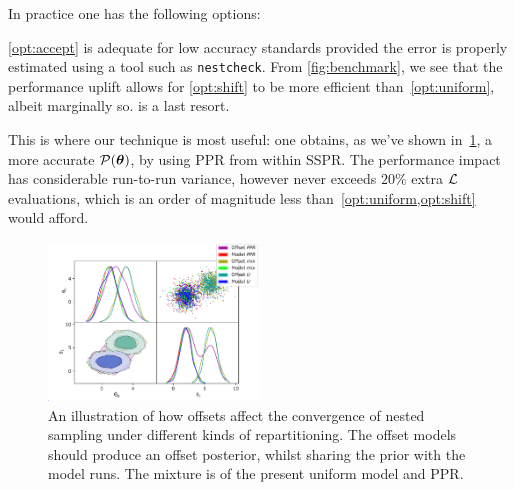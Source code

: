 \documentclass[usenatbib]{mnras}
\begin{document}
In practice one has the following options:
\vref{opt:accept} is adequate for low accuracy standards provided the
error is properly estimated using a tool such as \texttt{nestcheck}.
From \cref{fig:benchmark}, we see that the performance uplift allows
for \cref{opt:shift} to be more efficient than~\ref{opt:uniform},
albeit marginally so.  is a last resort.

This is where our technique is most useful: one obtains, as we've
shown in~\cref{fig:convergence}, a more accurate
\({\cal P}(\bm{\theta})\), by using PPR from within SSPR. The
performance impact has considerable run-to-run variance, however never
exceeds \(20\%\) extra \({\cal L}\) evaluations, which is an order of
magnitude less than~\vref{opt:uniform,opt:shift} would afford.

\begin{figure}
\includegraphics[width=0.5\textwidth]{./illustrations/convergence.pdf}
\caption{An illustration of how offsets affect the convergence of nested sampling under different kinds of repartitioning. The offset models should produce an offset posterior, whilst sharing the prior with the model runs. The mixture is of the present uniform model and PPR.\label{fig:convergence}}
\end{figure}
\end{document}
